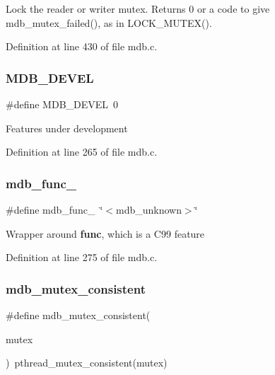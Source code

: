 Lock the reader or writer mutex. Returns 0 or a code to give mdb\+\_\+mutex\+\_\+failed(), as in L\+O\+C\+K\+\_\+\+M\+U\+T\+E\+X(). 

Definition at line 430 of file mdb.\+c.

\mbox{\label{group__compat_ga103b045068a1d21bf2347a7342f8f486}} 
\subsubsection{\texorpdfstring{M\+D\+B\+\_\+\+D\+E\+V\+EL}{MDB\_DEVEL}}
{\footnotesize\ttfamily \#define M\+D\+B\+\_\+\+D\+E\+V\+EL~0}

Features under development 

Definition at line 265 of file mdb.\+c.

\mbox{\label{group__compat_ga506f7f49894aad220a0b158acd6eb276}} 
\subsubsection{\texorpdfstring{mdb\+\_\+func\+\_\+}{mdb\_func\_}}
{\footnotesize\ttfamily \#define mdb\+\_\+func\+\_\+~\char`\"{}$<$mdb\+\_\+unknown$>$\char`\"{}}

Wrapper around {\bfseries func}, which is a C99 feature 

Definition at line 275 of file mdb.\+c.

\mbox{\label{group__compat_gaa7c1835176dba083697c5555571a8710}} 
\subsubsection{\texorpdfstring{mdb\+\_\+mutex\+\_\+consistent}{mdb\_mutex\_consistent}}
{\footnotesize\ttfamily \#define mdb\+\_\+mutex\+\_\+consistent(\begin{DoxyParamCaption}\item[{}]{mutex }\end{DoxyParamCaption})~pthread\+\_\+mutex\+\_\+consistent(mutex)}

